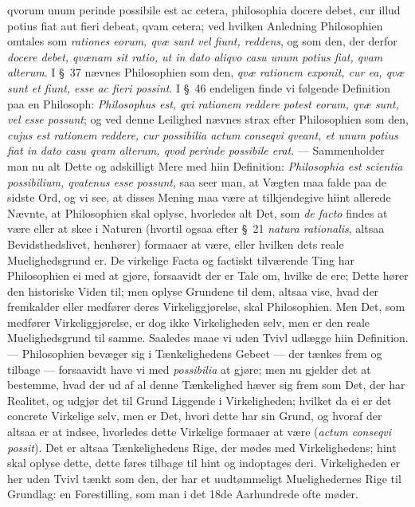 \documentclass[12pt,a4paper]{book}
\begin{document}
{{qvorum unum perinde possibile est ac cetera, philosophia docere debet, cur illud
potius fiat aut fieri debeat, qvam cetera}; ved hvilken Anledning Philosophien
omtales som \textit{rationes eorum, qvæ sunt vel fiunt, reddens}, og som den, der
derfor \textit{docere debet, qvænam sit ratio, ut in dato aliqvo casu unum potius
fiat, qvam alterum}. I \S~37 nævnes Philosophien som den, \textit{qvæ rationem
exponit, cur ea, qvæ sunt et fiunt, esse ac fieri possint}. I \S~46 endeligen finde
vi følgende Definition paa en Philosoph: \textit{Philosophus est, qvi rationem
reddere potest eorum, qvæ sunt, vel esse possunt}; og ved denne Leilighed nævnes
strax efter Philosophien som den, \textit{cujus est rationem reddere, cur possibilia
actum conseqvi qveant, et unum potius fiat in dato casu qvam alterum, qvod perinde
possibile erat}. --- Sammenholder man nu alt Dette og adskilligt Mere med hiin
Definition: \textit{Philosophia est scientia possibilium, qvatenus esse possunt},
saa seer man, at Vægten maa falde paa de sidste Ord, og vi see, at disses Mening maa
være at tilkjendegive hiint allerede Nævnte, at Philosophien skal oplyse, hvorledes
alt Det, som \textit{de facto} findes at være eller at skee i Naturen (hvortil ogsaa
efter \S~21 \textit{natura rationalis}, altsaa Bevidsthedslivet, henhører) formaaer
at være, eller hvilken dets reale Muelighedsgrund er. De virkelige Facta og
factiskt tilværende Ting har Philosophien ei med at gjøre, forsaavidt der er Tale
om, hvilke de ere; Dette hører den historiske Viden til; men oplyse Grundene til
dem, altsaa vise, hvad der fremkalder eller medfører deres Virkeliggjørelse, skal
Philosophien. Men Det, som medfører Virkeliggjørelse, er dog ikke Virkeligheden
selv, men er den reale Muelighedsgrund til samme. Saaledes maae vi uden Tvivl
udlægge hiin Definition. --- Philosophien bevæger sig i Tænkelighedens Gebeet --- der
tænkes frem og tilbage --- forsaavidt have vi med \textit{possibilia} at gjøre; men
nu gjelder det at bestemme, hvad der ud af al denne Tænkelighed hæver sig frem som
Det, der har Realitet, og udgjør det til Grund Liggende i Virkeligheden; hvilket da
ei er det concrete Virkelige selv, men er Det, hvori dette har sin Grund, og hvoraf
der altsaa er at indsee, hvorledes dette Virkelige formaaer at være (\textit{actum
conseqvi possit}). Det er altsaa Tænkelighedens Rige, der mødes med Virkelighedens;
hint skal oplyse dette, dette føres tilbage til hint og indoptages deri.
Virkeligheden er her uden Tvivl tænkt som den, der har et uudtømmeligt Muelighedernes
Rige til Grundlag: en Forestilling, som man i det 18de Aarhundrede ofte møder.\par}
\end{document}
